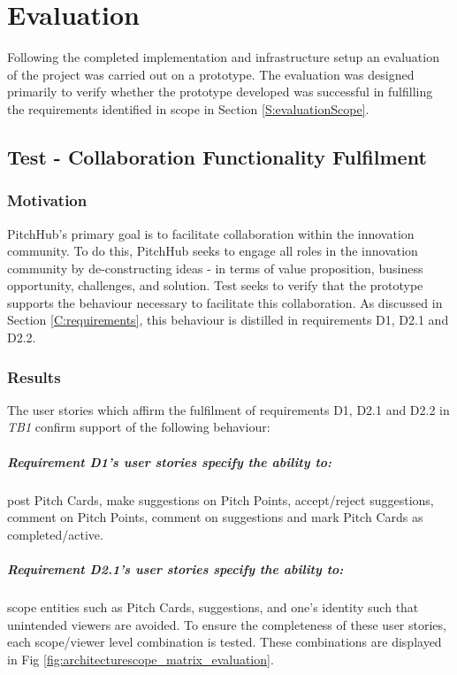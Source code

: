 \chapter{Evaluation}
Following the completed implementation and infrastructure setup an evaluation of the project was carried out on a prototype. The evaluation was designed primarily to verify whether the prototype developed was successful in fulfilling the requirements identified in scope in Section \ref{S:evaluationScope}.

\section{Test  - Collaboration Functionality Fulfilment}

\subsection{Motivation}
PitchHub's primary goal is to facilitate collaboration within the innovation community. To do this, PitchHub seeks to engage all roles in the innovation community by de-constructing ideas - in terms of  value proposition, business opportunity, challenges, and solution. Test  seeks to verify that the prototype supports the behaviour necessary to facilitate this collaboration. As discussed in Section \ref{C:requirements}, this behaviour is distilled in requirements D1, D2.1 and D2.2.

\subsection{Results}
The user stories which affirm the fulfilment of requirements D1, D2.1 and D2.2 in \textit{TB1} confirm support of the following behaviour:

\paragraph{Requirement D1's user stories specify the ability to:} post Pitch Cards, make suggestions on Pitch Points, accept/reject suggestions, comment on Pitch Points, comment on suggestions and mark Pitch Cards as completed/active.

\paragraph{Requirement D2.1's user stories specify the ability to:} scope entities such as Pitch Cards, suggestions, and one's identity such that unintended viewers are avoided. To ensure the completeness of these user stories, each scope/viewer level combination is tested. These combinations are displayed in Fig \ref{fig:architecturescope_matrix_evaluation}.

